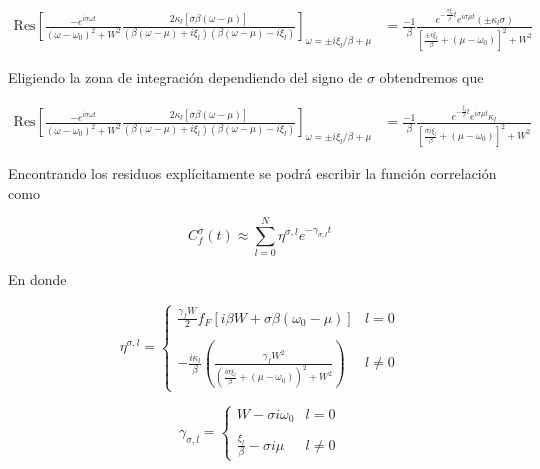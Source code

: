 \begin{appendixs}
\begin{align*}
    \text{Res} \left[ \frac{-e^{i\sigma \omega t}}{(\omega - \omega_{0})^{2} + W^{2} } \frac{ 2\kappa_{l}[\sigma \beta (\omega-\mu)] }{ (\beta(\omega-\mu) + i \xi_{l} )(\beta(\omega-\mu) - i \xi_{l})} \right]_{\omega = \pm i \xi_{l}/\beta + \mu} & = \frac{-1}{\beta} \frac{e^{- \frac{\sigma \xi_{l}}{\beta}t} e^{i\sigma \mu t}(\pm \kappa_{l}\sigma )}{ [ \frac{ \pm i\xi_{l}}{\beta} + (\mu - \omega_{0}) ]^{2} + W^{2} } 
\end{align*}

Eligiendo la zona de integración dependiendo del signo de $\sigma$ obtendremos que 

\begin{align*}
    \text{Res} \left[ \frac{-e^{i\sigma \omega t}}{(\omega - \omega_{0})^{2} + W^{2} } \frac{ 2\kappa_{l}[\sigma \beta (\omega-\mu)] }{ (\beta(\omega-\mu) + i \xi_{l} )(\beta(\omega-\mu) - i \xi_{l})} \right]_{\omega = \pm i \xi_{l}/\beta + \mu} & = \frac{-1}{\beta} \frac{e^{- \frac{ \xi_{l}}{\beta}t} e^{i\sigma \mu t} \kappa_{l} }{ [ \frac{ \sigma i\xi_{l}}{\beta} + (\mu - \omega_{0}) ]^{2} + W^{2} } 
\end{align*}

Encontrando los residuos explícitamente se podrá escribir la función correlación como

\begin{equation*}
    C^{\sigma}_{f}(t) \approx \sum_{l=0}^{N} \eta^{\sigma,l} e^{-\gamma_{\sigma,l} t}
\end{equation*}

En donde 

\begin{equation*}
    \eta^{\sigma,l} = \left\{ \begin{array}{lc} \frac{\gamma_{f}W}{2} f_{F}[i\beta W + \sigma \beta (\omega_{0}-\mu)]  & l = 0 \\ \\ - \frac{i\kappa_{l}}{\beta} \left(\frac{\gamma_{f}W^{2}}{ (\frac{i\sigma \xi_{l}}{\beta} + (\mu-\omega_{0}))^{2} + W^{2} } \right) &  l \neq 0 \end{array} \right.
\end{equation*}

\begin{equation*}
    \gamma_{\sigma,l} =  \left\{ \begin{array}{lc} W- \sigma i \omega_{0}  & l = 0 \\ \\ \frac{\xi_{l}}{\beta} - \sigma i \mu &  l \neq 0 \end{array} \right.
\end{equation*}


\end{appendixs}
